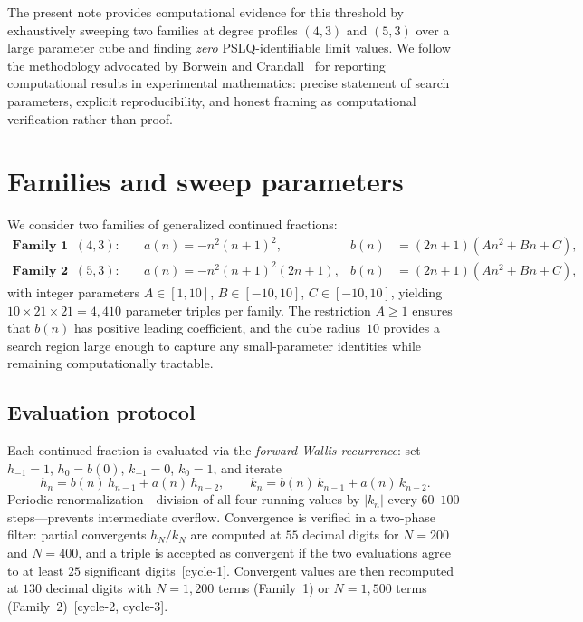 \documentclass[11pt]{amsart}
\theoremstyle{plain}
\theoremstyle{remark}
\begin{document}
The present note provides computational evidence for this
threshold by exhaustively sweeping two families at degree profiles
$(4,3)$ and $(5,3)$ over a large parameter cube and finding
\emph{zero} PSLQ-identifiable limit values.
We follow the methodology advocated by Borwein and
Crandall~\cite{borwein2013} for reporting computational results
in experimental mathematics:
precise statement of search parameters, explicit reproducibility,
and honest framing as computational verification rather than proof.

\section{Families and sweep parameters}\label{sec:setup}

We consider two families of generalized continued fractions:
\begin{align}
  \textbf{Family~1}\;\; (4,3)\colon\quad
  & a(n) = -n^2(n+1)^2,
  & b(n) &= (2n+1)(An^2 + Bn + C),
  \label{eq:fam1} \\[4pt]
  \textbf{Family~2}\;\; (5,3)\colon\quad
  & a(n) = -n^2(n+1)^2(2n+1),
  & b(n) &= (2n+1)(An^2 + Bn + C),
  \label{eq:fam2}
\end{align}
with integer parameters $A \in [1,10]$, $B \in [-10,10]$,
$C \in [-10,10]$,
yielding $10 \times 21 \times 21 = 4{,}410$ parameter triples
per family.
The restriction $A \geq 1$ ensures that $b(n)$ has positive
leading coefficient, and the cube radius~$10$ provides a search
region large enough to capture any small-parameter identities
while remaining computationally tractable.

\subsection{Evaluation protocol}
Each continued fraction is evaluated via the \emph{forward Wallis
recurrence}: set $h_{-1} = 1$, $h_0 = b(0)$,
$k_{-1} = 0$, $k_0 = 1$, and iterate
\begin{equation}\label{eq:wallis}
  h_n = b(n)\,h_{n-1} + a(n)\,h_{n-2}, \qquad
  k_n = b(n)\,k_{n-1} + a(n)\,k_{n-2}.
\end{equation}
Periodic renormalization---division of all four running values
by $|k_n|$ every $60$--$100$ steps---prevents intermediate overflow.
Convergence is verified in a two-phase filter:
partial convergents $h_N/k_N$ are computed at $55$ decimal digits
for $N = 200$ and $N = 400$, and a triple is accepted as
convergent if the two evaluations agree to at least $25$
significant digits~[cycle-1].
Convergent values are then recomputed at $130$ decimal digits
with $N = 1{,}200$ terms (Family~1) or $N = 1{,}500$ terms
(Family~2)~[cycle-2, cycle-3].
\end{document}
